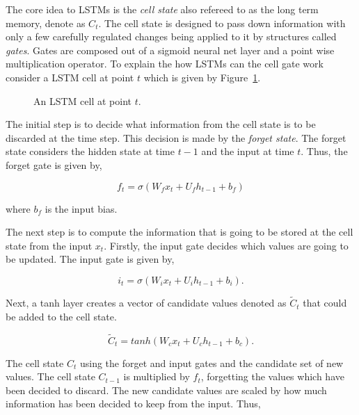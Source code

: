 The core idea to LSTMs is the \textit{cell state} also refereed to as the
long term memory, denote as \(C_t\). The cell state is designed to pass down
information with only a few carefully regulated changes being applied to it
by structures called \textit{gates}. Gates are composed out of a sigmoid neural
net layer and a point wise multiplication operator. To explain the how LSTMs
can the cell gate work consider a LSTM cell at point \(t\) which is given by
Figure~\ref{fig:lstm_cell}.

\begin{figure}[!htbp]
    \centering
    
    \caption{An LSTM cell at point \(t\).}\label{fig:lstm_cell}
\end{figure}

The initial step is to decide what information from the cell state is to be
discarded at the time step. This decision is made by the \textit{forget state}.
The forget state considers the hidden state at time \(t-1\) and the input at time
\(t\). Thus, the forget gate is given by,

\begin{equation}\label{eq:forget_gate}
    f_{t} = \sigma(W_{f}x_{t} + U_{f}h_{t-1} + b_{f})
\end{equation}

where \(b_{f}\) is the input bias.

The next step is to compute the information that is going to be stored at the
cell state from the input \(x_t\). Firstly, the input gate decides which values
are going to be updated. The input gate is given by,

\begin{equation}\label{eq:input_gate}
    i_{t} = \sigma(W_{i}x_{t} + U_{i}h_{t-1} + b_{i}).
\end{equation}

Next, a tanh layer creates a vector of candidate values denoted as \(\tilde{C}_{t}\)
that could be added to the cell state.

\begin{equation}\label{eq:input_gate}
    \tilde{C}_{t} = tanh(W_{c}x_{t} + U_{c}h_{t-1} + b_{c}).
\end{equation}

The cell state \(C_{t}\) using the forget and input gates and the candidate
set of new values. The cell state \(C_{t-1}\) is multiplied by \(f_{t}\), forgetting
the values which have been decided to discard. The new candidate values are
scaled by how much information has been decided to keep from the input. Thus,

